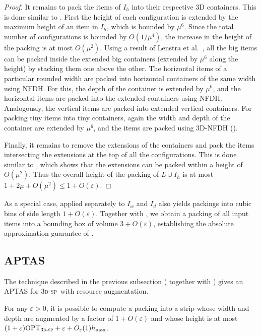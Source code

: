 \documentclass[a4paper,UKenglish,cleveref, autoref, thm-restate]{lipics-v2021}
\newcommand{\opt}{\mathrm{OPT}}
\newcommand{\tsp}{\textsc{3d-sp}\xspace}
\begin{document}
\begin{proof}
It remains to pack the items of $I_h$ into their respective 3D containers. This is done similar to \cite{3d-strip-packing}. First the height of each configuration is extended by the maximum height of an item in $I_h$, which is bounded by $\mu^6$. Since the total number of configurations is bounded by $O(1/\mu^4)$, the increase in the height of the packing is at most $O(\mu^2)$. Using a result of Lenstra et al.~\cite{lenstra1990approximation}, all the big items can be packed inside the extended big containers (extended by $\mu^6$ along the height) by stacking them one above the other. The horizontal items of a particular rounded width are packed into horizontal containers of the same width using NFDH. For this, the depth of the container is extended by $\mu^6$, and the horizontal items are packed into the extended containers using NFDH. Analogously, the vertical items are packed into extended vertical containers. For packing tiny items into tiny containers, again the width and depth of the container are extended by $\mu^6$, and the items are packed using 3D-NFDH (). 

Finally, it remains to remove the extensions of the containers and pack the items intersecting the extensions at the top of all the configurations. This is done similar to \cite{3d-strip-packing}, which shows that the extensions can be packed within a height of $O(\mu^2)$. Thus the overall height of the packing of $L\cup I_h$ is at most $1+2\mu + O(\mu^2) \le 1+O(\varepsilon)$.
\end{proof}

As a special case,  applied separately to $I_w$ and $I_d$ also yields packings into cubic bins of side length $1+O(\varepsilon)$. Together with , we obtain a packing of all input items into a bounding box of volume $3+O(\varepsilon)$, establishing the absolute approximation guarantee of .







\subsection{APTAS}
The technique described in the previous subsection ( together with \cite{3d-strip-packing}) gives an APTAS for \tsp~with resource augmentation.

\begin{lemma}
    For any $\varepsilon>0$, it is possible to compute a packing into a strip whose width and depth are augmented by a factor of $1+O(\varepsilon)$ and whose height is at most $(1+\varepsilon)\opt_{\tsp}+\varepsilon+O_{\varepsilon}(1)h_{\max}$.
\end{lemma}
\end{document}
